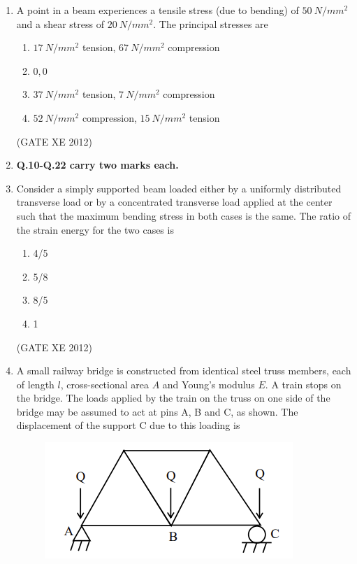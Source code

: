 \documentclass[12pt]{article}
\begin{document}
\begin{enumerate}
\item A point in a beam experiences a tensile stress (due to bending) of $50~N/mm^2$ and a shear stress of 
$20~N/mm^2$. The principal stresses are  

\begin{enumerate}
    \item $17~N/mm^2$ tension, $67~N/mm^2$ compression
    \item $0, 0$
    \item $37~N/mm^2$ tension, $7~N/mm^2$ compression
    \item $52~N/mm^2$ compression, $15~N/mm^2$ tension
\end{enumerate}
(GATE XE 2012)

\item[] \textbf{Q.10-Q.22 carry two marks each.}

\item Consider a simply supported beam loaded either by a uniformly distributed transverse load or by a concentrated transverse load applied at the center such that the maximum bending stress in both cases is the same. The ratio of the strain energy for the two cases is  

\begin{multicols}{4}
\begin{enumerate}
    \item 4/5
    \item 5/8
    \item 8/5
    \item 1
\end{enumerate}
\end{multicols}
(GATE XE 2012)


\item A small railway bridge is constructed from identical steel truss members, each of length $l$, cross-sectional area $A$ and Young’s modulus $E$. A train stops on the bridge. The loads applied by the train on the truss on one side of the bridge may be assumed to act at pins A, B and C, as shown. The displacement of the support C due to this loading is  

\begin{figure}[H]
    \centering
    \includegraphics[width=0.5\columnwidth]{figs/ass2_d_q11.png}
    \caption{}
    \label{fig:placeholder}
\end{figure}


\end{enumerate}
\end{document}
